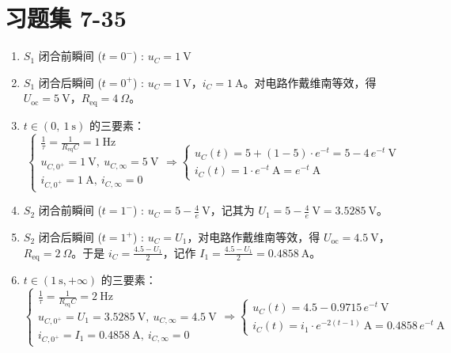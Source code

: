 \documentclass[UTF8]{report}
\def\Hz{\ \mathrm{Hz}}
\theoremstyle{MyLineTheoremStyle} %
\theoremstyle{MyBlockTheoremStyle} %
\theoremstyle{MySubsubsectionStyle} %
\begin{document}
\section{习题集 7-35}
\begin{enumerate}
\item $S_1$ 闭合前瞬间 ($t = 0^-$) : $u_C = 1 \ \mathrm{V}$
\item $S_1$ 闭合后瞬间 ($t = 0^+$) : $u_C = 1 \ \mathrm{V}$，$i_C = 1 \ \mathrm{A}$。对电路作戴维南等效，得 $U_{\text{oc}} = 5 \ \mathrm{V}$，$R_{\text{eq}} = 4 \ \Omega$。
\item $t \in (0,\ 1 \ \mathrm{s})$ 的三要素： 
\begin{equation}
\begin{cases}
    \frac{1}{\tau} = \frac{1}{R_{\text{eq}}C} = 1 \Hz \\ 
    u_{C, 0^+} = 1 \ \mathrm{V},\  u_{C, \infty} = 5 \ \mathrm{V} \\ 
    i_{C, 0^+} = 1 \ \mathrm{A},\ i_{C, \infty} = 0
\end{cases}\Longrightarrow 
\begin{cases}
    u_C(t) = 5 + (1 - 5)\cdot e^{-t} = 5 - 4 \,e^{-t} \ \mathrm{V} \\ 
    i_C(t) = 1\cdot e^{-t} \ \mathrm{A} = e^{-t} \ \mathrm{A}
\end{cases}
\end{equation}

\item $S_2$ 闭合前瞬间 ($t = 1^-$) : $u_C = 5 - \frac{4}{e} \ \mathrm{V}$，记其为 $U_1 = 5 - \frac{4}{e} \ \mathrm{V} = 3.5285 \ \mathrm{V}$。
\item $S_2$ 闭合后瞬间 ($t = 1^+$) : $u_C = U_1$，对电路作戴维南等效，得 $U_{\text{oc}} = 4.5 \ \mathrm{V}$，$R_{\text{eq}} = 2 \ \Omega$。于是 $i_C = \frac{4.5 - U_1}{2} $，记作 $I_1 = \frac{4.5 - U_1}{2} = 0.4858 \ \mathrm{A}$。
\item $t \in (1 \ \mathrm{s}, + \infty)$ 的三要素：
\begin{equation}
    \begin{cases}
        \frac{1}{\tau} = \frac{1}{R_{\text{eq}}C} = 2 \Hz \\ 
        u_{C, 0^+} = U_1 = 3.5285 \ \mathrm{V},\  u_{C, \infty} = 4.5 \ \mathrm{V} \\ 
        i_{C, 0^+} = I_1 = 0.4858 \ \mathrm{A},\ i_{C, \infty} = 0
    \end{cases}\Longrightarrow 
    \begin{cases}
        u_C(t) = 4.5 - 0.9715 \,e^{-t} \ \mathrm{V} \\ 
        i_C(t) = i_1\cdot e^{-2(t-1)} \ \mathrm{A} = 0.4858 \,e^{-t} \ \mathrm{A}
    \end{cases}
    \end{equation}
\end{enumerate}
\end{document}
